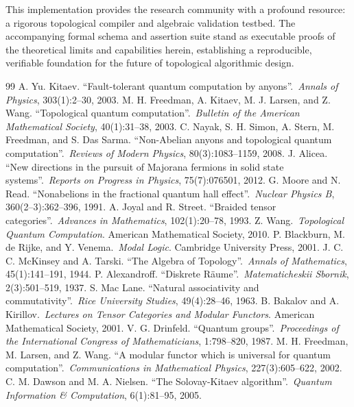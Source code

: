 This implementation provides the research community with a profound resource: a rigorous topological compiler and algebraic validation testbed. The accompanying formal schema and assertion suite stand as executable proofs of the theoretical limits and capabilities herein, establishing a reproducible, verifiable foundation for the future of topological algorithmic design.

\begin{thebibliography}{99}
 A. Yu. Kitaev. ``Fault-tolerant quantum computation by anyons''.\ \textit{Annals of Physics}, 303(1):2--30, 2003.
 M. H. Freedman, A. Kitaev, M. J. Larsen, and Z. Wang. ``Topological quantum computation''.\ \textit{Bulletin of the American Mathematical Society}, 40(1):31--38, 2003.
 C. Nayak, S. H. Simon, A. Stern, M. Freedman, and S. Das Sarma. ``Non-Abelian anyons and topological quantum computation''.\ \textit{Reviews of Modern Physics}, 80(3):1083--1159, 2008.
 J. Alicea. ``New directions in the pursuit of Majorana fermions in solid state systems''.\ \textit{Reports on Progress in Physics}, 75(7):076501, 2012.
 G. Moore and N. Read. ``Nonabelions in the fractional quantum hall effect''.\ \textit{Nuclear Physics B}, 360(2--3):362--396, 1991.
 A. Joyal and R. Street. ``Braided tensor categories''.\ \textit{Advances in Mathematics}, 102(1):20--78, 1993.
 Z. Wang.\ \textit{Topological Quantum Computation}. American Mathematical Society, 2010.
 P. Blackburn, M. de Rijke, and Y. Venema.\ \textit{Modal Logic}. Cambridge University Press, 2001.
 J. C. C. McKinsey and A. Tarski. ``The Algebra of Topology''.\ \textit{Annals of Mathematics}, 45(1):141--191, 1944.
 P. Alexandroff. ``Diskrete Räume''.\ \textit{Matematicheskii Sbornik}, 2(3):501--519, 1937.
 S. Mac Lane. ``Natural associativity and commutativity''.\ \textit{Rice University Studies}, 49(4):28--46, 1963.
 B. Bakalov and A. Kirillov.\ \textit{Lectures on Tensor Categories and Modular Functors}. American Mathematical Society, 2001.
 V. G. Drinfeld. ``Quantum groups''.\ \textit{Proceedings of the International Congress of Mathematicians}, 1:798--820, 1987.
 M. H. Freedman, M. Larsen, and Z. Wang. ``A modular functor which is universal for quantum computation''.\ \textit{Communications in Mathematical Physics}, 227(3):605--622, 2002.
 C. M. Dawson and M. A. Nielsen. ``The Solovay-Kitaev algorithm''.\ \textit{Quantum Information \& Computation}, 6(1):81--95, 2005.

\end{thebibliography}
